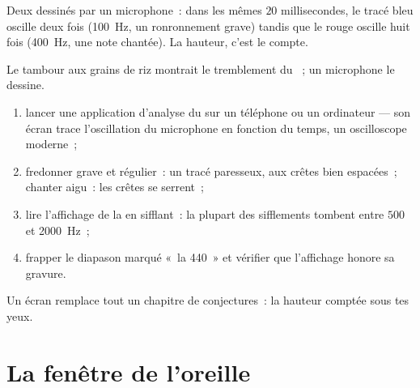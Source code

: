 \begin{omfigure}

{\small Deux  dessinés par un microphone~: dans les mêmes $20$
millisecondes, le tracé bleu oscille deux fois (\qty{100}{Hz}, un
ronronnement grave) tandis que le rouge oscille huit fois
(\qty{400}{Hz}, une note chantée). La hauteur, c'est le compte.}
\end{omfigure}

\begin{method}\label{met:g8:sound-pitch-loudness:seeing}
Le tambour aux grains de riz montrait le tremblement du ~; un
microphone le dessine.
\begin{enumerate}
  \item lancer une application d'analyse du  sur un téléphone ou
        un ordinateur --- son écran trace l'oscillation du
        microphone en fonction du temps, un oscilloscope moderne~;
  \item fredonner grave et régulier~: un tracé paresseux, aux
        crêtes bien espacées~; chanter aigu~: les crêtes se
        serrent~;
  \item lire l'affichage de la  en sifflant~: la plupart
        des sifflements tombent entre $500$ et \qty{2000}{Hz}~;
  \item frapper le diapason marqué «~la 440~» et vérifier que
        l'affichage honore sa gravure.
\end{enumerate}
Un écran remplace tout un chapitre de conjectures~: la hauteur
comptée sous tes yeux.
\end{method}

\section{La fenêtre de l'oreille}

